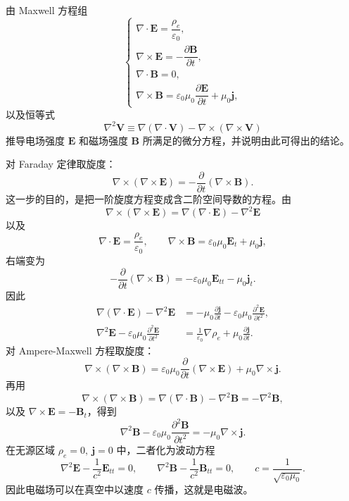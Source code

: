 \begin{question}
由 Maxwell 方程组
\[
\begin{cases}
\nabla\cdot\bm E=\dfrac{\rho_e}{\varepsilon_0},\\
\nabla\times\bm E=-\dfrac{\partial\bm B}{\partial t},\\
\nabla\cdot\bm B=0,\\
\nabla\times\bm B=\varepsilon_0\mu_0\dfrac{\partial\bm E}{\partial t}+\mu_0\bm j,
\end{cases}
\]
以及恒等式
\[
\nabla^2\bm V\equiv
\nabla(\nabla\cdot\bm V)-\nabla\times(\nabla\times\bm V)
\]
推导电场强度 \(\bm E\) 和磁场强度 \(\bm B\) 所满足的微分方程，并说明由此可得出的结论。
\begin{solution}
对 Faraday 定律取旋度：
\[
\nabla\times(\nabla\times\bm E)
=-\frac{\partial}{\partial t}(\nabla\times\bm B).
\]
这一步的目的，是把一阶旋度方程变成含二阶空间导数的方程。由
\[
\nabla\times(\nabla\times\bm E)
=\nabla(\nabla\cdot\bm E)-\nabla^2\bm E
\]
以及
\[
\nabla\cdot\bm E=\frac{\rho_e}{\varepsilon_0},\qquad
\nabla\times\bm B=\varepsilon_0\mu_0\bm E_t+\mu_0\bm j,
\]
右端变为
\[
-\frac{\partial}{\partial t}(\nabla\times\bm B)
=-\varepsilon_0\mu_0\bm E_{tt}-\mu_0\bm j_t.
\]
因此
\[
\begin{split}
\nabla(\nabla\cdot\bm E)-\nabla^2\bm E
&=-\mu_0\frac{\partial\bm j}{\partial t}
-\varepsilon_0\mu_0\frac{\partial^2\bm E}{\partial t^2},\\
\nabla^2\bm E-\varepsilon_0\mu_0\frac{\partial^2\bm E}{\partial t^2}
&=\frac{1}{\varepsilon_0}\nabla\rho_e+\mu_0\frac{\partial\bm j}{\partial t}.
\end{split}
\]
对 Ampere-Maxwell 方程取旋度：
\[
\nabla\times(\nabla\times\bm B)
=\varepsilon_0\mu_0\frac{\partial}{\partial t}(\nabla\times\bm E)
+\mu_0\nabla\times\bm j.
\]
再用
\[
\nabla\times(\nabla\times\bm B)
=\nabla(\nabla\cdot\bm B)-\nabla^2\bm B=-\nabla^2\bm B,
\]
以及 \(\nabla\times\bm E=-\bm B_t\)，得到
\[
\nabla^2\bm B-\varepsilon_0\mu_0\frac{\partial^2\bm B}{\partial t^2}
=-\mu_0\nabla\times\bm j.
\]
在无源区域 \(\rho_e=0,\ \bm j=0\) 中，二者化为波动方程
\[
\nabla^2\bm E-\frac{1}{c^2}\bm E_{tt}=0,\qquad
\nabla^2\bm B-\frac{1}{c^2}\bm B_{tt}=0,
\qquad
c=\frac{1}{\sqrt{\varepsilon_0\mu_0}}.
\]
因此电磁场可以在真空中以速度 \(c\) 传播，这就是电磁波。
\end{solution}
\end{question}

